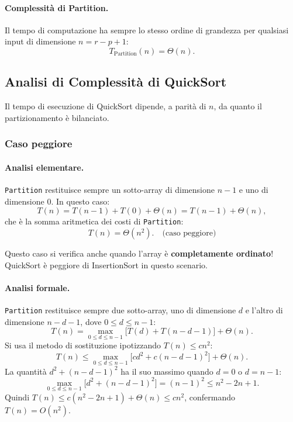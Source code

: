 \paragraph{Complessità di Partition.}
Il tempo di computazione ha sempre lo stesso ordine di grandezza
per qualsiasi input di dimensione $n = r - p + 1$:
\[
T_{\text{Partition}}(n) = \Theta(n).
\]

\subsection{Analisi di Complessità di QuickSort}

\begin{softnote}
	Il tempo di esecuzione di QuickSort dipende, a parità di $n$,
	da quanto il partizionamento è bilanciato.
\end{softnote}

\subsubsection{Caso peggiore}

\paragraph{Analisi elementare.}
\texttt{Partition} restituisce sempre un sotto-array di dimensione
$n-1$ e uno di dimensione $0$. In questo caso:
\[
T(n) = T(n-1) + T(0) + \Theta(n) = T(n-1) + \Theta(n),
\]
che è la somma aritmetica dei costi di \texttt{Partition}:
\[
T(n) = \Theta(n^2). \quad \text{(caso peggiore)}
\]

\begin{hardnote}
	Questo caso si verifica anche quando l'array è \textbf{completamente
		ordinato}! QuickSort è peggiore di InsertionSort in questo scenario.
\end{hardnote}

\paragraph{Analisi formale.}
\texttt{Partition} restituisce sempre due sotto-array, uno di dimensione
$d$ e l'altro di dimensione $n-d-1$, dove $0 \le d \le n-1$:
\[
T(n) = \max_{0 \le d \le n-1}\bigl[T(d) + T(n-d-1)\bigr] + \Theta(n).
\]
Si usa il metodo di sostituzione ipotizzando $T(n) \le cn^2$:
\[
T(n) \le \max_{0 \le d \le n-1}\bigl[cd^2 + c(n-d-1)^2\bigr] + \Theta(n).
\]
La quantità $d^2 + (n-d-1)^2$ ha il suo massimo quando $d=0$ o
$d=n-1$:
\[
\max_{0 \le d \le n-1}\bigl[d^2 + (n-d-1)^2\bigr] = (n-1)^2
\le n^2 - 2n + 1.
\]
Quindi $T(n) \le c(n^2 - 2n + 1) + \Theta(n) \le cn^2$, confermando
$T(n) = O(n^2)$.

